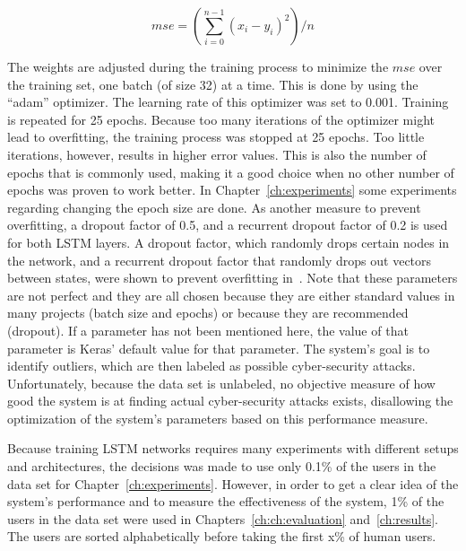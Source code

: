 \begin{equation} \label{eq:mse}
mse = (\sum\limits_{i=0}^{n - 1} {(x_i - y_i)}^2) / n
\end{equation}

The weights are adjusted during the training process to minimize the \(mse\) over the training set, one batch (of size 32) at a time. This is done by using the \enquote{adam} optimizer. The learning rate of this optimizer was set to 0.001. Training is repeated for 25 epochs. Because too many iterations of the optimizer might lead to overfitting, the training process was stopped at 25 epochs. Too little iterations, however, results in higher error values. This is also the number of epochs that is commonly used, making it a good choice when no other number of epochs was proven to work better. In Chapter~\ref{ch:experiments} some experiments regarding changing the epoch size are done. As another measure to prevent overfitting, a dropout factor of 0.5, and a recurrent dropout factor of 0.2 is used for both LSTM layers. A dropout factor, which randomly drops certain nodes in the network, and a recurrent dropout factor that randomly drops out vectors between states, were shown to prevent overfitting in~\cite{srivastava2014dropout}. Note that these parameters are not perfect and they are all chosen because they are either standard values in many projects (batch size and epochs) or because they are recommended (dropout). If a parameter has not been mentioned here, the value of that parameter is Keras' default value for that parameter. The system's goal is to identify outliers, which are then labeled as possible cyber-security attacks. Unfortunately, because the data set is unlabeled, no objective measure of how good the system is at finding actual cyber-security attacks exists, disallowing the optimization of the system's parameters based on this performance measure.

Because training LSTM networks requires many experiments with different setups and architectures, the decisions was made to use only 0.1\% of the users in the data set for Chapter~\ref{ch:experiments}. However, in order to get a clear idea of the system's performance and to measure the effectiveness of the system, 1\% of the users in the data set were used in Chapters~\ref{ch:ch:evaluation} and~\ref{ch:results}. The users are sorted alphabetically before taking the first x\% of human users.

